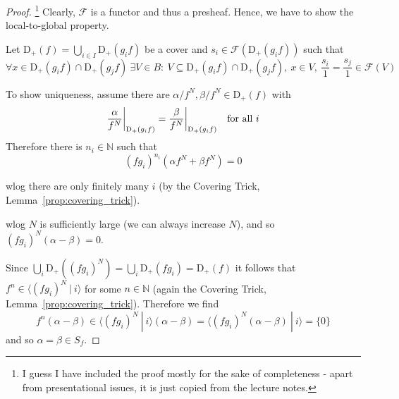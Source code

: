 \documentclass{scrartcl}
\newcommand{\N}{\mathbb{N}}
\newcommand{\D}[1]{\mathrm{D}_+(#1)}
\newcommand\restr[2]{{
    \left.\kern-\nulldelimiterspace
    #1
    \vphantom{\big|}
    \right|_{#2}
}}
\theoremstyle{definition}
\begin{document}
\begin{proof}\footnote{I guess I have included the proof mostly for the sake of completeness - apart from presentational issues, it is just copied from the lecture notes.}
    Clearly, $\mathcal{F}$ is a functor and thus a presheaf.
    Hence, we have to show the local-to-global property.

    Let $\D{f} = \bigcup_{i \in I} \D{g_if}$ be a cover and $s_i \in \mathcal{F}(\D{g_if})$ such that
    \begin{equation*}
        \forall x \in \D{g_if} \cap \D{g_jf} \ \exists V \in B: \ V \subseteq \D{g_if} \cap \D{g_jf}, \ x \in V, \ \frac {s_i} 1 = \frac {s_j} 1 \in \mathcal{F}(V)
    \end{equation*}

    To show uniqueness, assume there are $\alpha/f^N, \beta/f^N \in \D{f}$ with
    \begin{equation*}
        \restr{\frac {\alpha} {f^N}}{\D{g_if}} = \restr{\frac {\beta} {f^N}}{\D{g_if}} \quad \text{for all $i$}
    \end{equation*}
    Therefore there is $n_i \in \N$ such that
    \begin{equation*}
        (fg_i)^{n_i} (\alpha f^N + \beta f^N) = 0
    \end{equation*}

    wlog there are only finitely many $i$ (by the Covering Trick, Lemma~\ref{prop:covering_trick}).

    wlog $N$ is sufficiently large (we can always increase $N$), and so $(fg_i)^N(\alpha - \beta) = 0$.

    Since $\bigcup_i \D{(fg_i)^N} = \bigcup_i \D{fg_i} = \D{f}$ it follows that $f^n \in \langle (fg_i)^N \ | \ i \rangle$ for some $n \in \N$ (again the Covering Trick, Lemma~\ref{prop:covering_trick}).
    Therefore we find
    \begin{equation*}
        f^n(\alpha - \beta) \in \langle (fg_i)^N \ | \ i \rangle (\alpha - \beta) = \langle (fg_i)^N (\alpha - \beta) \ | \ i \rangle = \{ 0 \}
    \end{equation*}
    and so $\alpha = \beta \in S_f$.


\end{proof}
\end{document}
